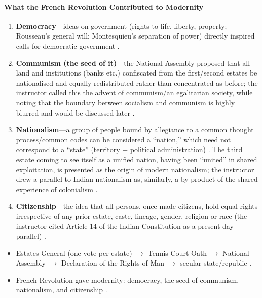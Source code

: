 \paragraph{What the French Revolution Contributed to Modernity}

\begin{KeyConcept}
\begin{enumerate}
    \item \textbf{Democracy}---ideas on government (rights to life, liberty, property; Rousseau's general will; Montesquieu's separation of power) directly inspired calls for democratic government .
    \item \textbf{Communism (the seed of it)}---the National Assembly proposed that all land and institutions (banks etc.) confiscated from the first/second estates be nationalised and equally redistributed rather than concentrated as before; the instructor called this the advent of communism/an egalitarian society, while noting that the boundary between socialism and communism is highly blurred and would be discussed later .
    \item \textbf{Nationalism}---a group of people bound by allegiance to a common thought process/common codes can be considered a ``nation,'' which need not correspond to a ``state'' (territory + political administration) . The third estate coming to see itself as a unified nation, having been ``united'' in shared exploitation, is presented as the origin of modern nationalism; the instructor drew a parallel to Indian nationalism as, similarly, a by-product of the shared experience of colonialism .
    \item \textbf{Citizenship}---the idea that all persons, once made citizens, hold equal rights irrespective of any prior estate, caste, lineage, gender, religion or race (the instructor cited Article 14 of the Indian Constitution as a present-day parallel) .
\end{enumerate}
\end{KeyConcept}

\begin{QuickRevision}
\begin{itemize}
    \item Estates General (one vote per estate) $\rightarrow$ Tennis Court Oath $\rightarrow$ National Assembly $\rightarrow$ Declaration of the Rights of Man $\rightarrow$ secular state/republic .
    \item French Revolution gave modernity: democracy, the seed of communism, nationalism, and citizenship .
\end{itemize}
\end{QuickRevision}

